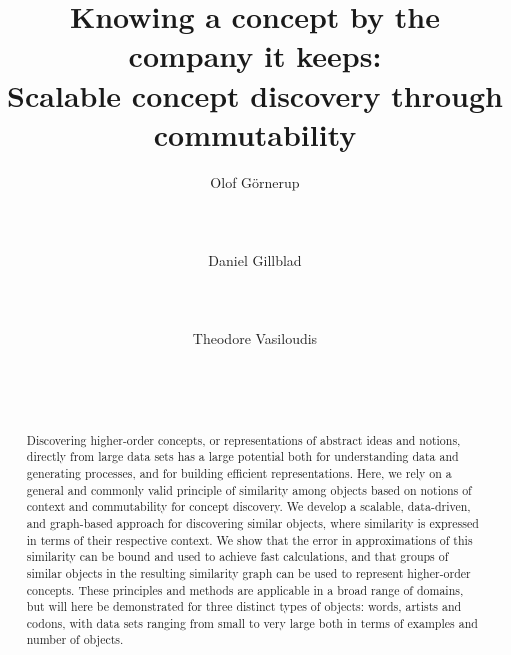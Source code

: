 \documentclass{sig-alternate}
\begin{document}
\title{Knowing a concept by the company it keeps:\\Scalable concept discovery through commutability}

\author{
\alignauthor
Olof G\"{o}rnerup\\ %
       \\
       \\
       \\
\alignauthor
Daniel Gillblad\\ %
       \\
       \\
       \\
\alignauthor
Theodore Vasiloudis\\ %
       \\
       \\
       \\
}



\maketitle


\begin{abstract}
\begin{sloppypar}
Discovering higher-order concepts, or representations of abstract ideas and notions, directly from large data sets has
a large potential both for understanding data and generating processes, and for building efficient representations. Here, we
rely on a general and commonly valid principle of similarity among objects based on notions of context and
commutability for concept discovery. We develop a scalable, data-driven, and graph-based approach for discovering
similar objects, where similarity is expressed in terms of their respective context. We show that the
error in approximations of this similarity can be bound and used to achieve fast calculations, and that groups of
similar objects in the resulting similarity graph can be used to represent higher-order concepts. These principles and
methods are applicable in a broad range of domains, but will here be demonstrated for three distinct types of objects:
words, artists and codons, with data sets ranging from small to very large both in terms of examples and number
of objects.
\end{sloppypar}
\end{abstract}
\end{document}
